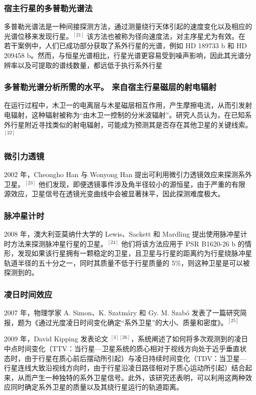 \subsubsection{宿主行星的多普勒光谱法}
多普勒光谱法是一种间接探测方法，通过测量绕行天体引起的速度变化以及相应的光谱位移来发现行星。$^{[21]}$ 该方法也被称为径向速度法，对主序星尤为有效。在若干案例中，人们已成功部分获取了系外行星的光谱，例如 HD 189733 b 和 HD 209458 b。然而，与恒星光谱相比，行星光谱更容易受到噪声影响，因此其光谱分辨率以及可提取的谱线数量，都远低于执行系外行星\subsubsection{多普勒光谱分析所需的水平。
来自宿主行星磁层的射电辐射}
在运行过程中，木卫一的电离层与木星磁层相互作用，产生摩擦电流，从而引发射电辐射，这种辐射被称为“由木卫一控制的分米波辐射”。研究人员认为，在已知系外行星附近寻找类似的射电辐射，可能成为预测其是否存在其他卫星的关键线索。$^{[22]}$
\subsubsection{微引力透镜}
2002 年，Cheongho Han 与 Wonyong Han 提出可利用微引力透镜效应来探测系外卫星。$^{[23]}$ 他们发现，即便透镜事件涉及角半径较小的源恒星，由于严重的有限源效应，卫星信号在透镜光变曲线中会被显著抹平，因此探测难度极大。
\subsubsection{脉冲星计时}
2008 年，澳大利亚莫纳什大学的 Lewis、Sackett 和 Mardling 提出使用脉冲星计时方法来探测脉冲星行星的卫星。$^{[24]}$ 他们将该方法应用于 PSR B1620-26 b 的情形，发现如果该行星拥有一颗稳定的卫星，且卫星与行星的距离约为行星绕脉冲星轨道半径的五十分之一，同时其质量不低于行星质量的 5\%，则这种卫星是可以被探测到的。
\subsubsection{凌日时间效应}
2007 年，物理学家 A. Simon、K. Szatmáry 和 Gy. M. Szabó 发表了一篇研究简报，题为《通过光度凌日时间变化确定“系外卫星”的大小、质量和密度》。$^{[25]}$

2009 年，David Kipping 发表论文 $^{[3][26]}$，系统阐述了如何将多次观测到的凌日中点时间变化（TTV：当行星—卫星系统的质心相对于视线方向处于近乎垂直状态时，由于行星在质心前后摆动所引起）与凌日持续时间变化（TDV：当卫星—行星连线大致沿视线方向时，由于行星沿凌日路径相对于质心运动所引起）结合起来，从而产生一种独特的系外卫星信号。此外，该研究还表明，可以利用这两种效应同时确定系外卫星的质量以及其绕行星运行的轨道距离。

